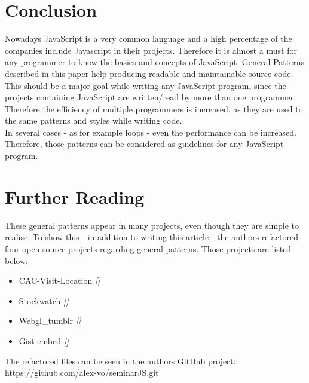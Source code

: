 \documentclass{bioinfo}
\begin{document}
\section{Conclusion}

Nowadays JavaScript is a very common language and a high percentage of the companies include Javascript in their projects. Therefore it is almost a must for any programmer to know the basics and concepts of JavaScript. General Patterns described in this paper help producing readable and maintainable source code. \\
This should be a major goal while writing any JavaScript program, since the projects containing JavaScript are written/read by more than one programmer. Therefore the efficiency of multiple programmers is increased, as they are used to the same patterns and styles while writing code.\\
In several cases - as for example loops - even the performance can be increased.
Therefore, those patterns can be considered as guidelines for any JavaScript program.\\[0.2cm]

\section{Further Reading}
\label{furread}
These general patterns appear in many projects, even though they are simple to realise. To show this - in addition to writing this article - the authors refactored four open source projects regarding general patterns. Those projects are listed below:
\begin{itemize}
\item CAC-Visit-Location \textit{[\citealp{francisco}]}
\item Stockwatch \textit{[\citealp{gronlund}]}
\item Webgl\_tumblr \textit{[\citealp{obuchi}]}
\item Gist-embed \textit{[\citealp{vanderhoof}]}
\end{itemize}
The refactored files can be seen in the authors GitHub project:
https://github.com/alex-vo/seminarJS.git

%
%
%
%
%
\end{document}
